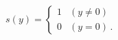 \begin{equation}
  s(y) = \left\{ \begin{array}{ll}
    1 & (y\ne0)\\ 0 & (y=0)\,.\end{array}\right.
\end{equation}

